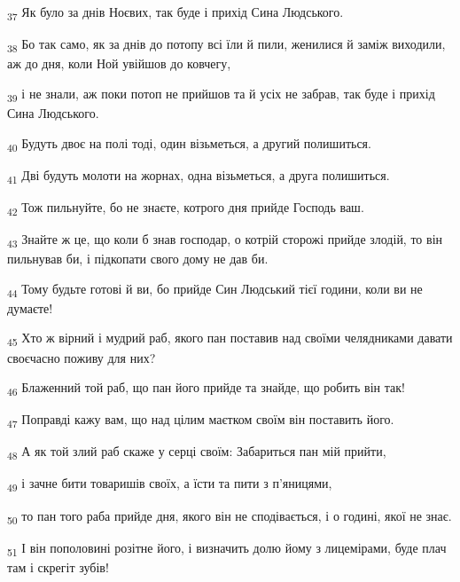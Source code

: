 \begin{tcolorbox}
\textsubscript{37} Як було за днів Ноєвих, так буде і прихід Сина Людського.
\end{tcolorbox}
\begin{tcolorbox}
\textsubscript{38} Бо так само, як за днів до потопу всі їли й пили, женилися й заміж виходили, аж до дня, коли Ной увійшов до ковчегу,
\end{tcolorbox}
\begin{tcolorbox}
\textsubscript{39} і не знали, аж поки потоп не прийшов та й усіх не забрав, так буде і прихід Сина Людського.
\end{tcolorbox}
\begin{tcolorbox}
\textsubscript{40} Будуть двоє на полі тоді, один візьметься, а другий полишиться.
\end{tcolorbox}
\begin{tcolorbox}
\textsubscript{41} Дві будуть молоти на жорнах, одна візьметься, а друга полишиться.
\end{tcolorbox}
\begin{tcolorbox}
\textsubscript{42} Тож пильнуйте, бо не знаєте, котрого дня прийде Господь ваш.
\end{tcolorbox}
\begin{tcolorbox}
\textsubscript{43} Знайте ж це, що коли б знав господар, о котрій сторожі прийде злодій, то він пильнував би, і підкопати свого дому не дав би.
\end{tcolorbox}
\begin{tcolorbox}
\textsubscript{44} Тому будьте готові й ви, бо прийде Син Людський тієї години, коли ви не думаєте!
\end{tcolorbox}
\begin{tcolorbox}
\textsubscript{45} Хто ж вірний і мудрий раб, якого пан поставив над своїми челядниками давати своєчасно поживу для них?
\end{tcolorbox}
\begin{tcolorbox}
\textsubscript{46} Блаженний той раб, що пан його прийде та знайде, що робить він так!
\end{tcolorbox}
\begin{tcolorbox}
\textsubscript{47} Поправді кажу вам, що над цілим маєтком своїм він поставить його.
\end{tcolorbox}
\begin{tcolorbox}
\textsubscript{48} А як той злий раб скаже у серці своїм: Забариться пан мій прийти,
\end{tcolorbox}
\begin{tcolorbox}
\textsubscript{49} і зачне бити товаришів своїх, а їсти та пити з п'яницями,
\end{tcolorbox}
\begin{tcolorbox}
\textsubscript{50} то пан того раба прийде дня, якого він не сподівається, і о годині, якої не знає.
\end{tcolorbox}
\begin{tcolorbox}
\textsubscript{51} І він пополовині розітне його, і визначить долю йому з лицемірами, буде плач там і скрегіт зубів!
\end{tcolorbox}
